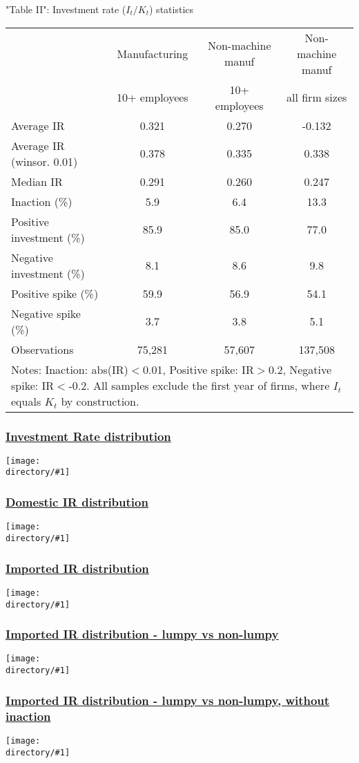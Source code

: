 \documentclass[10pt]{beamer}
\newcommand{\directory}{figures}
\newcommand{\longfigure}[2]{\begin{frame}\frametitle{\hyperlink{#1back}{#2}}\hypertarget{#1}{{\begin{center}\texttt{[image: \\directory/\#1]}\end{center}}}\end{frame}}
\begin{document}
\begin{frame}{"Table II": Investment rate (${I_t}/{K_t}$) statistics}
\begin{table}
\vspace{0.3cm} \renewcommand{\baselinestretch}{1.2} \vspace{0.3cm} \scriptsize \centering
    \begin{tabular}{lccc}
    \hline \hline
	& Manufacturing & Non-machine manuf & Non-machine manuf \\
	& 10+ employees & 10+ employees & all firm sizes \\
	\hline
	Average IR & 0.321 & 0.270 & -0.132 \\
	Average IR (winsor. 0.01) & 0.378 & 0.335 & 0.338 \\
	Median IR & 0.291 & 0.260 & 0.247 \\
	Inaction (\%) & 5.9   & 6.4   & 13.3 \\
	Positive investment (\%) & 85.9  & 85.0  & 77.0 \\
	Negative investment (\%) & 8.1   & 8.6   & 9.8 \\
	Positive spike (\%) & 59.9  & 56.9  & 54.1 \\
	Negative spike (\%) & 3.7   & 3.8   & 5.1 \\
	\hline
	Observations &   75,281    &   57,607    &  137,508    \\
	\hline \hline
	\multicolumn{4}{l}{%
	\begin{minipage}{9cm}
			\scriptsize Notes: Inaction: abs(IR)$<$0.01, Positive spike: IR$>$0.2, Negative spike: IR$<$-0.2. All samples exclude the first year of firms, where  $I_t$ equals $K_t$ by construction.%
	\end{minipage}%
	}\\
\end{tabular}%
\renewcommand{\baselinestretch}{1.62}\normalsize \setlength{\baselineskip}{0.65\baselineskip}
\end{table}
\end{frame}

\longfigure{IR_dist_tot}{Investment Rate distribution}
\longfigure{IR_dist_dom}{Domestic IR distribution}
\longfigure{IR_dist_imp}{Imported IR distribution}
\longfigure{IR_dist_lumpiness}{Imported IR distribution - lumpy vs non-lumpy}
\longfigure{IR_dist_lumpiness_na}{Imported IR distribution - lumpy vs non-lumpy, without inaction}
\end{document}

